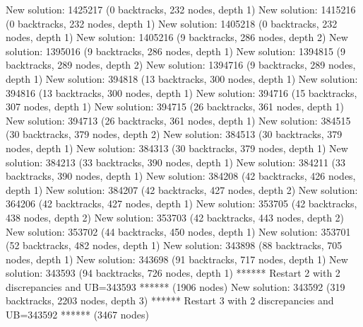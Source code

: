 \begin{enumerate}
{\begin{DoxyCode}
New solution: 1425217 (0 backtracks, 232 nodes, depth 1)
New solution: 1415216 (0 backtracks, 232 nodes, depth 1)
New solution: 1405218 (0 backtracks, 232 nodes, depth 1)
New solution: 1405216 (9 backtracks, 286 nodes, depth 2)
New solution: 1395016 (9 backtracks, 286 nodes, depth 1)
New solution: 1394815 (9 backtracks, 289 nodes, depth 2)
New solution: 1394716 (9 backtracks, 289 nodes, depth 1)
New solution: 394818 (13 backtracks, 300 nodes, depth 1)
New solution: 394816 (13 backtracks, 300 nodes, depth 1)
New solution: 394716 (15 backtracks, 307 nodes, depth 1)
New solution: 394715 (26 backtracks, 361 nodes, depth 1)
New solution: 394713 (26 backtracks, 361 nodes, depth 1)
New solution: 384515 (30 backtracks, 379 nodes, depth 2)
New solution: 384513 (30 backtracks, 379 nodes, depth 1)
New solution: 384313 (30 backtracks, 379 nodes, depth 1)
New solution: 384213 (33 backtracks, 390 nodes, depth 1)
New solution: 384211 (33 backtracks, 390 nodes, depth 1)
New solution: 384208 (42 backtracks, 426 nodes, depth 1)
New solution: 384207 (42 backtracks, 427 nodes, depth 2)
New solution: 364206 (42 backtracks, 427 nodes, depth 1)
New solution: 353705 (42 backtracks, 438 nodes, depth 2)
New solution: 353703 (42 backtracks, 443 nodes, depth 2)
New solution: 353702 (44 backtracks, 450 nodes, depth 1)
New solution: 353701 (52 backtracks, 482 nodes, depth 1)
New solution: 343898 (88 backtracks, 705 nodes, depth 1)
New solution: 343698 (91 backtracks, 717 nodes, depth 1)
New solution: 343593 (94 backtracks, 726 nodes, depth 1)
****** Restart 2 with 2 discrepancies and UB=343593 ****** (1906 nodes)
New solution: 343592 (319 backtracks, 2203 nodes, depth 3)
****** Restart 3 with 2 discrepancies and UB=343592 ****** (3467 nodes)


\end{DoxyCode}}
\end{enumerate}
